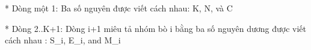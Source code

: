 * Dòng một 1: Ba số nguyên được viết cách nhau: K, N, và C  

   * Dòng 2..K+1: Dòng i+1 miêu tả nhóm bò i bằng ba số nguyên dương được viết cách nhau : S\_i, E\_i, and M\_i